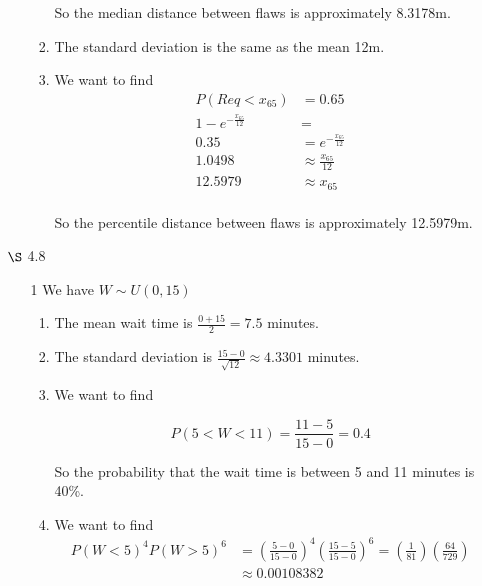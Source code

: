 \documentclass[12pt,letterpaper]{article}
\begin{document}
\begin{enumerate}
\begin{enumerate}
\begin{enumerate}[label=(\arabic*)]
              So the median distance between flaws is approximately 8.3178m.
            \item
              The standard deviation is the same as the mean 12m.
            \item
              We want to find
              \begin{align*}
                P(Req < x_{65}) &= 0.65 \\
                1 - e^{-\frac{x_{65}}{12}} &= \\
                0.35 &= e^{-\frac{x_{65}}{12}} \\
                1.0498 &\approx \frac{x_{65}}{12} \\
                12.5979 &\approx x_{65} \\
              \end{align*}

              So the  percentile distance between flaws is approximately 12.5979m.
          \end{enumerate}
      \end{enumerate}

    \item [$\S$ 4.8]
      \begin{enumerate}
        \item [1]
          We have $W \sim U(0, 15)$
          \begin{enumerate}[label=(\arabic*)]
            \item
              The mean wait time is $\frac{0 + 15}{2} = 7.5$ minutes.
            \item
              The standard deviation is $\frac{15 - 0}{\sqrt{12}} \approx 4.3301$ minutes.
            \item
              We want to find

              \[
                P(5 < W < 11) = \frac{11 - 5}{15 - 0} = 0.4
              \]

              So the probability that the wait time is between 5 and 11 minutes is 40\%.
            \item
              We want to find
              \begin{align*}
                P(W < 5)^4 P(W > 5)^6 &= \left(\frac{5 - 0}{15 - 0}\right)^4 \left(\frac{15 - 5}{15 - 0}\right)^6 = \left(\frac{1}{81}\right) \left(\frac{64}{729}\right) \\
                &\approx 0.00108382
              \end{align*}


\end{enumerate}
\end{enumerate}
\end{enumerate}
\end{document}
